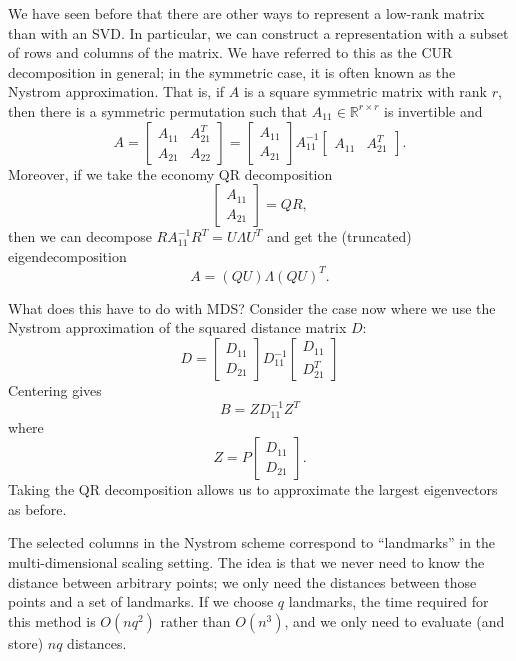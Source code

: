 \documentclass[12pt, leqno]{article} %
\begin{document}
We have seen before that there are other ways to represent a low-rank
matrix than with an SVD.  In particular, we can construct a
representation with a subset of rows and columns of the matrix.  We
have referred to this as the CUR decomposition in general; in the
symmetric case, it is often known as the Nystrom approximation.  That
is, if $A$ is a square symmetric matrix with rank $r$, then there is a
symmetric permutation such that $A_{11} \in \mathbb{R}^{r \times r}$
is invertible and
\[
  A =
  \begin{bmatrix}
    A_{11} & A_{21}^T \\
    A_{21} & A_{22}
  \end{bmatrix} =
  \begin{bmatrix} A_{11} \\ A_{21} \end{bmatrix}
  A_{11}^{-1}
  \begin{bmatrix} A_{11} & A_{21}^T \end{bmatrix}.
\]
Moreover, if we take the economy QR decomposition
\[
  \begin{bmatrix} A_{11} \\ A_{21} \end{bmatrix} = QR,
\]
then we can decompose $R A_{11}^{-1} R^T = U \Lambda U^T$ and get the
(truncated) eigendecomposition
\[
  A = (QU) \Lambda (QU)^T.
\]

What does this have to do with MDS?  Consider the case now where we
use the Nystrom approximation of the squared distance matrix $D$:
\[
D =
\begin{bmatrix} D_{11} \\ D_{21} \end{bmatrix}
D_{11}^{-1}
\begin{bmatrix} D_{11} \\ D_{21}^T \end{bmatrix}
\]
Centering gives
\[
  B = Z D_{11}^{-1} Z^T
\]
where
\[
  Z = P \begin{bmatrix} D_{11} \\ D_{21} \end{bmatrix}.
\]
Taking the QR decomposition allows us to approximate the largest
eigenvectors as before.

The selected columns in the Nystrom scheme correspond to ``landmarks''
in the multi-dimensional scaling setting.  The idea is that we never
need to know the distance between arbitrary points; we only need the
distances between those points and a set of landmarks.  If we choose
$q$ landmarks, the time required for this method is $O(nq^2)$ rather
than $O(n^3)$, and we only need to evaluate (and store) $nq$
distances.
\end{document}
